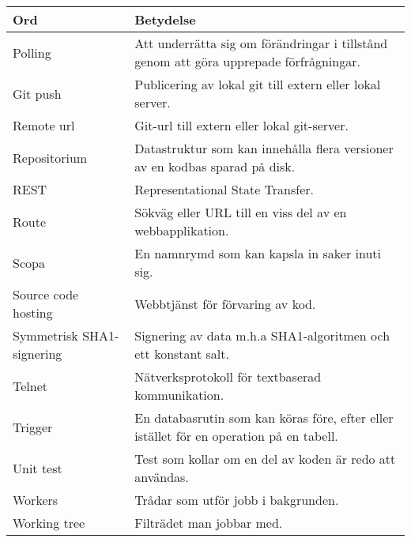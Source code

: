 \begin{tabular} { | l | p{10cm} | }
\hline
\bf{Ord} & \bf{Betydelse} \\
\hline
Polling & Att underrätta sig om förändringar i tillstånd genom att göra upprepade förfrågningar. \\
\hline
Git push & Publicering av lokal git till extern eller lokal server. \\
\hline
Remote url & Git-url till extern eller lokal git-server. \\
\hline
Repositorium & Datastruktur som kan innehålla flera versioner av en kodbas sparad på disk. \\
\hline
REST & Representational State Transfer. \\
\hline
Route & Sökväg eller URL till en viss del av en webbapplikation. \\
\hline
Scopa & En namnrymd som kan kapsla in saker inuti sig. \\
\hline
Source code hosting & Webbtjänst för förvaring av kod. \\
\hline
Symmetrisk SHA1-signering & Signering av data m.h.a SHA1-algoritmen och ett konstant salt. \\
\hline
Telnet & Nätverksprotokoll för textbaserad kommunikation. \\
\hline
Trigger & En databasrutin som kan köras före, efter eller istället för en operation på en tabell. \\
\hline
Unit test & Test som kollar om en del av koden är redo att användas. \\
\hline
Workers & Trådar som utför jobb i bakgrunden. \\
\hline
Working tree & Filträdet man jobbar med. \\
\hline
\end{tabular}
\normalsize


